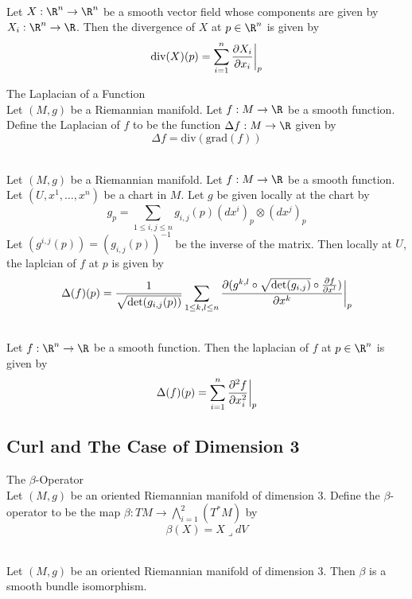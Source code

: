 \documentclass[a4paper]{article}
\begin{document}
\begin{eg}{}{}\\
Let $X:\R^n\to\R^n$ be a smooth vector field whose components are given by $X_i:\R^n\to\R$. Then the divergence of $X$ at $p\in\R^n$ is given by $$\text{div}(X)(p)=\sum_{i=1}^n\frac{\partial X_i}{\partial x_i}\bigg{|}_p$$
\end{eg}

\begin{defn}{The Laplacian of a Function}{}\\
Let $(M,g)$ be a Riemannian manifold. Let $f:M\to\R$ be a smooth function. Define the Laplacian of $f$ to be the function $\Delta f:M\to\R$ given by $$\Delta f=\text{div}(\text{grad}(f))$$
\end{defn}

\begin{prp}{}{}\\
Let $(M,g)$ be a Riemannian manifold. Let $f:M\to\R$ be a smooth function. Let $(U,x^1,\dots,x^n)$ be a chart in $M$. Let $g$ be given locally at the chart by $$g_p=\sum_{1\leq i,j\leq n}g_{i,j}(p)(dx^i)_p\otimes(dx^j)_p$$ Let $(g^{i,j}(p))=(g_{i,j}(p))^{-1}$ be the inverse of the matrix. Then locally at $U$, the laplcian of $f$ at $p$ is given by $$\Delta(f)(p)=\frac{1}{\sqrt{\det(g_{i,j}(p))}}\sum_{1\leq k,l\leq n}\frac{\partial(g^{k,l}\circ\sqrt{\det(g_{i,j})}\circ\frac{\partial f}{\partial x^l})}{\partial x^k}\bigg{|}_p$$
\end{prp}

\begin{eg}{}{}\\
Let $f:\R^n\to\R$ be a smooth function. Then the laplacian of $f$ at $p\in\R^n$ is given by $$\Delta(f)(p)=\sum_{i=1}^n\frac{\partial^2f}{\partial x_i^2}\bigg{|}_p$$
\end{eg}

\subsection{Curl and The Case of Dimension 3}
\begin{defn}{The $\beta$-Operator}{}\\
Let $(M,g)$ be an oriented Riemannian manifold of dimension $3$. Define the $\beta$-operator to be the map $\beta:TM\to\bigwedge_{i=1}^2(T^\ast M)$ by $$\beta(X)=X\lrcorner dV$$
\end{defn}

\begin{lmm}{}{}\\
Let $(M,g)$ be an oriented Riemannian manifold of dimension $3$. Then $\beta$ is a smooth bundle isomorphism. 
\end{lmm}
\end{document}
